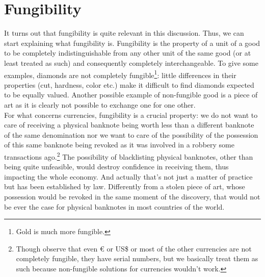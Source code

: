 \section{Fungibility}
It turns out that fungibility is quite relevant in this discussion. Thus, we can start explaining what fungibility is. Fungibility is the property of a unit of a good to be completely indistinguishable from any other unit of the same good (or at least treated as such) and consequently completely interchangeable. To give some examples, diamonds are not completely fungible\footnote{Gold is much more fungible.}: little differences in their properties (cut, hardness, color etc.) make it difficult to find diamonds expected to be equally valued. Another possible example of non-fungible good is a piece of art as it is clearly not possible to exchange one for one other.\\
For what concerns currencies, fungibility is a crucial property: we do not want to care of receiving a physical banknote being worth less than a different banknote of the same denomination nor we want to care of the possibility of the possession of this same banknote being revoked as it was involved in a robbery some transactions ago.\footnote{Though observe that even \euro{} or US\$ or most of the other currencies are not completely fungible, they have serial numbers, but we basically treat them as such because non-fungible solutions for currencies wouldn't work.} The possibility of blacklisting physical banknotes, other than being quite unfeasible, would destroy confidence in receiving them, thus impacting the whole economy. And actually that's not just a matter of practice but has been established by law. Differently from a stolen piece of art, whose possession would be revoked in the same moment of the discovery, that would not be ever the case for physical banknotes in most countries of the world.

